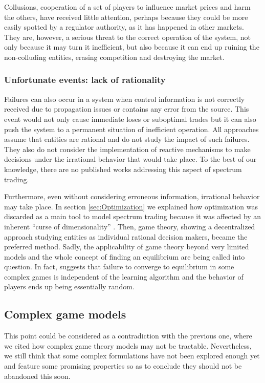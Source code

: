Collusions, cooperation of a set of players to influence market prices and harm the others, have received little attention, perhaps because they could be more easily spotted by a regulator authority, as it has happened in other markets. 
They are, however, a serious threat to the correct operation of the system, not only because it may turn it inefficient, but also because it can end up ruining the non-colluding entities, erasing competition and destroying the market.

\subsubsection{Unfortunate events: lack of rationality}
Failures can also occur in a system when control information is not correctly received due to propagation issues or contains any error from the source. 
This event would not only cause immediate loses or suboptimal trades but it can also push the system to a permanent situation of inefficient operation. 
All approaches assume that entities are rational and do not study the impact of such failures. They also do not consider the implementation of reactive mechanisms to make decisions under the irrational behavior that would take place. 
To the best of our knowledge, there are no published works addressing this aspect of spectrum trading.  

Furthermore, even without considering erroneous information, irrational behavior may take place. 
In section \ref{sec:Optimization} we explained how optimization was discarded as a main tool to model spectrum trading because it was affected by an inherent ``curse of dimensionality'' .
Then, game theory, showing a decentralized approach studying entities as individual rational decision makers, became the preferred method. 
Sadly, the applicability of game theory beyond very limited models and the whole concept of finding an equilibrium are being called into question. 
In fact, \cite{ref:Galla2013} suggests that failure to converge to equilibrium in some complex games is independent of the learning algorithm and the behavior of players ends up being essentially random.

\subsection{Complex game models}

This point could be considered as a contradiction with the previous one, where we cited how complex game theory models may not be tractable.
Nevertheless, we still think that some complex formulations have not been explored enough yet and feature some promising properties so as to conclude they should not be abandoned this soon. 

